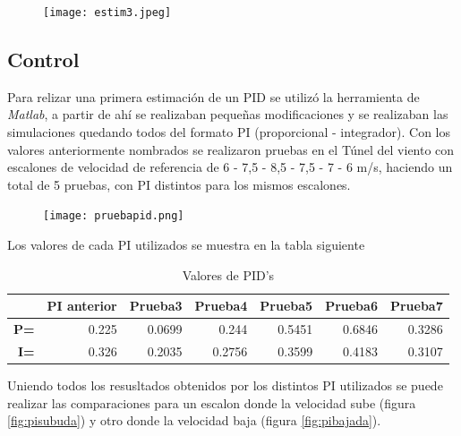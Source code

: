 \begin{figure}[htb]
	\centering
	\texttt{[image: estim3.jpeg]}
	\label{fig:estim3}
\end{figure}
    
       
    \subsection{Control}
    Para relizar una primera estimación de un PID se utilizó la herramienta de \textit{Matlab}, a partir de ahí se realizaban pequeñas modificaciones y se realizaban las simulaciones quedando todos del formato PI (proporcional - integrador).
    Con los valores anteriormente nombrados se realizaron pruebas en el Túnel del viento con escalones de velocidad de referencia de 6 - 7,5 - 8,5 - 7,5 - 7 - 6 m/s, haciendo un total de 5 pruebas, con PI distintos para los mismos escalones. 
    
    \begin{figure}[htb]
    	\centering
    	\texttt{[image: pruebapid.png]}
    	\label{fig:PI3}
    \end{figure}
    
    Los valores de cada PI utilizados se muestra en la tabla siguiente
    \begin{table}[h]
    	\centering
    	\begin{tabular}{r|r|r|r|r|r|r|}
    		\cline{2-7}
    		\multicolumn{1}{l|}{} & \multicolumn{1}{c|}{\textbf{PI anterior}} & \multicolumn{1}{c|}{\textbf{Prueba3}} & \multicolumn{1}{c|}{\textbf{Prueba4}} & \multicolumn{1}{c|}{\textbf{Prueba5}} & \multicolumn{1}{c|}{\textbf{Prueba6}} & \multicolumn{1}{c|}{\textbf{Prueba7}} \\ \hline
    		\multicolumn{1}{|r|}{\textbf{P=}} & 0.225 & 0.0699 & 0.244 & 0.5451 & 0.6846 & 0.3286 \\ \hline
    		\multicolumn{1}{|r|}{\textbf{I=}} & 0.326 & 0.2035 & 0.2756 & 0.3599 & 0.4183 & 0.3107 \\ \hline
    	\end{tabular}
    \caption{Valores de PID's}
    \end{table}
    
    Uniendo todos los resusltados obtenidos por los distintos PI utilizados se puede realizar las comparaciones para un escalon donde la velocidad sube (figura \ref{fig:pisubuda}) y otro donde la velocidad baja (figura \ref{fig:pibajada}).
    
